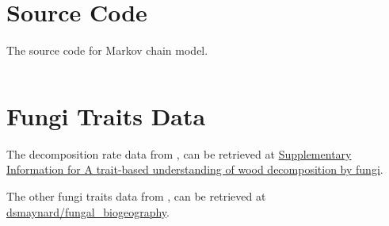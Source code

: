 \appendixpage
\appendix

\section{Source Code}

The source code for Markov chain model.

\inputminted[linenos=true, frame=single]{python}{codes/appendix.py}


\section{Fungi Traits Data}

The decomposition rate data from \cite{Lustenshouwer}, can be retrieved at \href{https://www.pnas.org/content/pnas/suppl/2020/05/13/1909166117.DCSupplemental/pnas.1909166117.sapp.pdf}{Supplementary Information for A trait-based understanding of wood decomposition by fungi}.

The other fungi traits data from \cite{Maynard-data}, can be retrieved at \href{https://github.com/dsmaynard/fungal_biogeography}{dsmaynard/fungal\_biogeography}.

